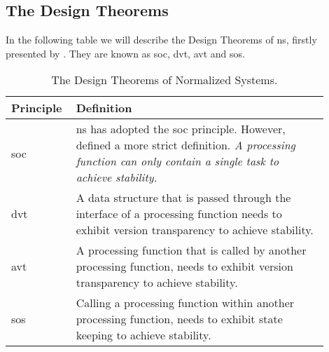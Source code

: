 \subsection{The Design Theorems} \label{subsec_ns_desing_theorems}

In the following table we will describe the Design Theorems of \gls{ns}, firstly presented
by \textcite[111-119]{mannaert_normalized_2009}. They are known as \gls{soc}, \gls{dvt},
\gls{avt} and \gls{sos}.

\begin{table}[H]
    \begin{tabular}{ p{0.15\linewidth} p{0.75\linewidth}}
        \hline
        \textbf{Principle} & \textbf{Definition} \\ 
        \hline
        \gls{soc} & \gls{ns} has adopted the \gls{soc} principle. However,
        \textcite[112]{mannaert_normalized_2009} defined a more strict definition. \emph{A
        processing function can only contain a single task to achieve stability.} \\
        
        \gls{dvt} &  A data structure that is passed through the interface of a processing function needs to
        exhibit version transparency to achieve stability.\\
        
        \gls{avt} & A processing function that is called by another processing function, needs to exhibit version
        transparency to achieve stability.\\
        
        \gls{sos} & Calling a processing function within another processing function, needs to exhibit state
        keeping to achieve stability.\\
        
        \bottomrule
    \end{tabular}
    \caption{The Design Theorems of Normalized Systems.}
    \label{ns_principles}
\end{table}